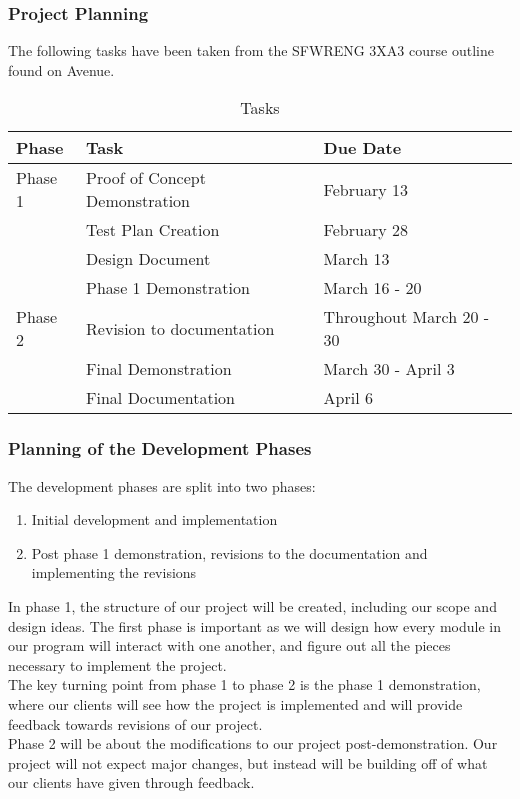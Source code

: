 \documentclass[12pt, titlepage]{article}
\begin{document}
\subsubsection{Project Planning}
The following tasks have been taken from the SFWRENG 3XA3 course outline found on Avenue.
\begin{table}[h]
    \centering
    \caption{Tasks}
    \begin{tabular}{|L{2cm}|L{6cm}|L{6cm}|}
        \hline
        Phase & Task & Due Date \\
        \hline
        Phase 1 & Proof of Concept Demonstration & February 13\\
         & Test Plan Creation & February 28\\
         & Design Document & March 13\\
         & Phase 1 Demonstration & March 16 - 20\\
        \hline
        Phase 2 & Revision to documentation & Throughout March 20 - 30\\
         & Final Demonstration & March 30 - April 3\\
         & Final Documentation & April 6\\
        \hline
        
    \end{tabular}
    \label{tab:task_table}
\end{table}

\subsubsection{Planning of the Development Phases}
The development phases are split into two phases:
\begin{enumerate}
    \item Initial development and implementation
    \item Post phase 1 demonstration, revisions to the documentation and implementing the revisions
\end{enumerate}
In phase 1, the structure of our project will be created, including our scope and design ideas. The first phase is important as we will design how every module in our program will interact with one another, and figure out all the pieces necessary to implement the project.\\
The key turning point from phase 1 to phase 2 is the phase 1 demonstration, where our clients will see how the project is implemented and will provide feedback towards revisions of our project.\\
Phase 2 will be about the modifications to our project post-demonstration. Our project will not expect major changes, but instead will be building off of what our clients have given through feedback.
\end{document}
